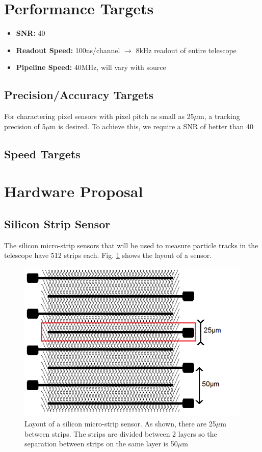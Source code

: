 \documentclass{article}
\newcommand{\itemt}[1]{\item \textbf{#1}}
\begin{document}
\section{Performance Targets}

\begin{itemize}
  \itemt{SNR:} 40
  \itemt{Readout Speed:} 100ns/channel $\rightarrow$ 8kHz readout of entire telescope
  \itemt{Pipeline Speed:} 40MHz, will vary with source
\end{itemize}


\subsection{Precision/Accuracy Targets}
For charactering pixel sensors with pixel pitch as small as 25$\mu$m, a tracking precision of 5$\mu$m is desired. To achieve this, we require a SNR of better than 40 
\subsection{Speed Targets}

\section{Hardware Proposal}

\subsection{Silicon Strip Sensor}
The silicon micro-strip sensors that will be used to measure particle tracks in the telescope have 512 strips each. Fig. \ref{fig:Microstrip_Sensor} shows the layout of a sensor.

\begin{figure}[h]
  \centering
  \includegraphics{./figures/Microstrip_Sensor.png}
  \caption{Layout of a silicon micro-strip sensor. As shown, there are 25$\mu$m between strips. The strips are divided between 2 layers so the separation between strips on the same layer is 50$\mu$m}
  \label{fig:Microstrip_Sensor}
\end{figure}
\end{document}
